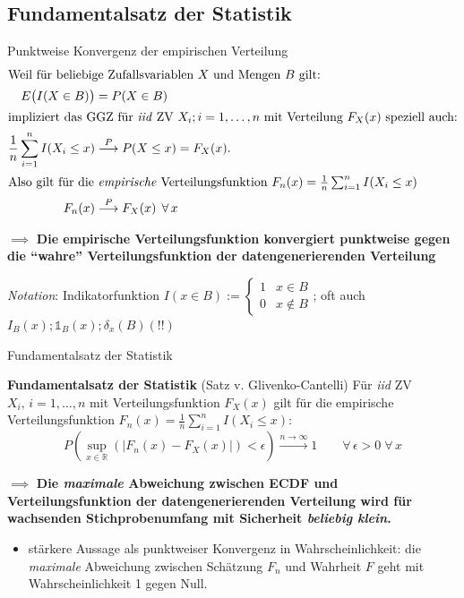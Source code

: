\documentclass[
  10pt,
  ignorenonframetext,
]{beamer}
\providecommand{\tightlist}{%
  \setlength{\itemsep}{0pt}\setlength{\parskip}{0pt}}
\begin{document}
\subsection{Fundamentalsatz der
Statistik}\label{fundamentalsatz-der-statistik}

\begin{frame}{Punktweise Konvergenz der empirischen Verteilung}
\label{punktweise-konvergenz-der-empirischen-verteilung}
\begin{align*}
\intertext{Weil für beliebige Zufallsvariablen $X$ und Mengen $B$  gilt:} E\big(I(X \in B)\big) &= P(X \in B) \\
\intertext{impliziert das GGZ für \emph{iid} ZV $X_i; i = 1,\dots,n$ mit Verteilung $F_X(x)$  speziell auch:}
\frac{1}{n} \sum^n_{i = 1} I(X_i \leq x) &\stackrel{P}{\longrightarrow} P(X \leq x) = F_X(x). \\
\intertext{Also gilt für die \emph{empirische} Verteilungsfunktion $F_n(x) = \frac{1}{n} \sum^n_{i = 1} I(X_i \leq x)$}
F_n(x) &\stackrel{P}{\longrightarrow} F_X(x) \;\,\forall\, x
\end{align*}

\(\implies\) \textbf{Die empirische Verteilungsfunktion konvergiert
punktweise gegen die ``wahre'' Verteilungsfunktion der
datengenerierenden Verteilung}

\scriptsize

\emph{Notation}: Indikatorfunktion
\(I(x \in B) := \begin{cases} 1 & x \in B \\ 0 & x \notin B \end{cases}\);
oft auch \(I_B(x); \symbf{\Bbbone}_B(x); \delta_x(B) (!!)\)
\end{frame}

\begin{frame}{Fundamentalsatz der Statistik}
\label{fundamentalsatz-der-statistik-1}
\begin{block}{\textbf{Fundamentalsatz der Statistik} (Satz v.
Glivenko-Cantelli)}
\label{fundamentalsatz-der-statistik-satz-v.-glivenko-cantelli}
Für \emph{iid} ZV \(X_i,\, i = 1,\dots,n\) mit Verteilungsfunktion
\(F_X(x)\) gilt für die empirische Verteilungsfunktion
\(F_n(x) = \frac{1}{n} \sum^n_{i = 1} I(X_i \leq x)\):
\[P\left(\sup_{x \in \mathbb R}\left(|F_n(x) - F_X(x)|\right) < \epsilon\right) \stackrel{n \to \infty}{\longrightarrow} 1 \qquad \forall\, \epsilon > 0 \;\forall\, x \]
\end{block}

\(\implies\) \textbf{Die \emph{maximale} Abweichung zwischen ECDF und
Verteilungsfunktion der datengenerierenden Verteilung wird für
wachsenden Stichprobenumfang mit Sicherheit \emph{beliebig klein}.}

\begin{itemize}
\tightlist
\item
  stärkere Aussage als punktweiser Konvergenz in Wahrscheinlichkeit: die
  \emph{maximale} Abweichung zwischen Schätzung \(F_n\) und Wahrheit
  \(F\) geht mit Wahrscheinlichkeit 1 gegen Null.
\end{itemize}

\scriptsize\normalsize
\end{frame}
\end{document}
